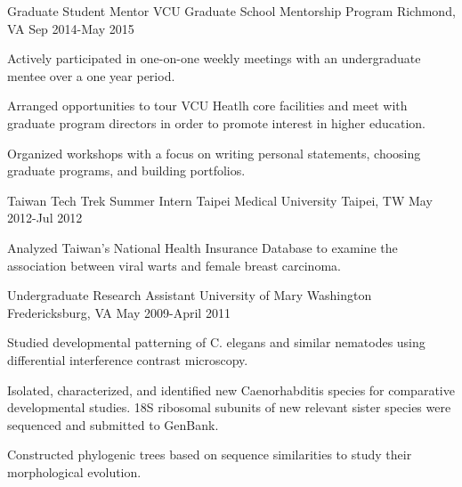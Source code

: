 \begin{cventries}
    \cventry
    {Graduate Student Mentor} %
    {VCU Graduate School Mentorship Program} %
    {Richmond, VA} %
    {Sep 2014-May 2015} %
    {
      \begin{cvitems} %
        \item {Actively participated in one-on-one weekly meetings with an undergraduate mentee over a one year period.}
        \item {Arranged opportunities to tour VCU Heatlh core facilities and meet with graduate program directors in order to promote interest in higher education.}
        \item {Organized workshops with a focus on writing personal statements, choosing graduate programs, and building portfolios.} 
      \end{cvitems}
    }

\cventry
{Taiwan Tech Trek Summer Intern} %
{Taipei Medical University} %
{Taipei, TW} %
{May 2012-Jul 2012} %
{
  \begin{cvitems} %
    \item {Analyzed Taiwan's National Health Insurance Database to examine the association between viral warts and female breast carcinoma.}
  \end{cvitems}
}

\cventry
{Undergraduate Research Assistant} %
{University of Mary Washington} %
{Fredericksburg,  VA} %
{May 2009-April 2011} %
{
  \begin{cvitems} %
    \item {Studied developmental patterning of C. elegans and similar nematodes using differential interference contrast microscopy.}
    \item {Isolated, characterized, and identified new Caenorhabditis species for comparative developmental studies. 18S ribosomal subunits of new relevant sister species were sequenced and submitted to GenBank.}
    \item {Constructed phylogenic trees based on sequence similarities to study their morphological evolution.}
  \end{cvitems}
}

\end{cventries}
